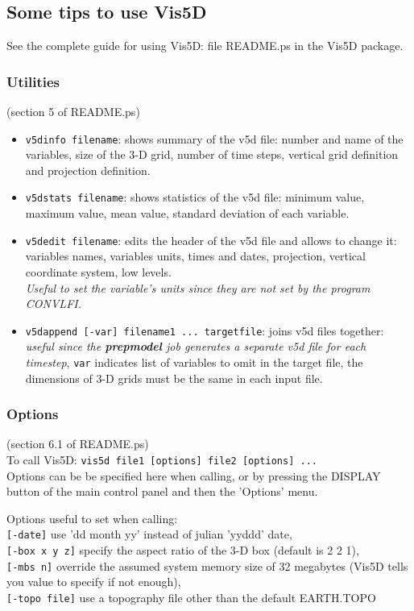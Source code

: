\subsection{Some tips to use Vis5D}
See the complete guide for using Vis5D: file README.ps in the Vis5D package.

\subsubsection{Utilities} (section 5 of README.ps)
\begin{itemize}
\item
{\tt v5dinfo filename}: shows summary of the v5d file: number and name of
the variables, size of the 3-D grid, number of time steps, vertical
grid definition and projection definition.
\item
{\tt v5dstats filename}: shows statistics of the v5d file:
minimum value, maximum value, mean value, standard deviation of
 each variable.
\item
{\tt v5dedit filename}: edits the header of the v5d file and allows to change
it: variables names, variables units, times and dates, projection, vertical
coordinate system, low levels. \\
{\it Useful to set the variable's units since they are not set by the program
 CONVLFI.}
\item
{\tt v5dappend [-var] filename1 ... targetfile}: joins v5d files together: 
{\it useful since the {\bf prepmodel} job generates a separate v5d file for each
 timestep}, {\tt var} indicates list of variables to omit in the target file,
the dimensions of 3-D grids must be the same in each input file.
\end{itemize}

\subsubsection{Options} \label{ss:opt} (section 6.1 of README.ps) \\

To call Vis5D: {\tt vis5d file1 [options] file2 [options] ...} \\
Options can be be specified here when calling, or by pressing the {\sf DISPLAY}
button of the main control panel and then the 'Options' menu.

Options useful to set when calling: \\
{\tt [-date]} use 'dd month yy' instead of julian 'yyddd' date, \\
{\tt [-box x y z]} specify the aspect ratio of the 3-D box (default is 2 2 1), \\
{\tt [-mbs n]} override the assumed system memory size of 32 megabytes (Vis5D
tells you value to specify if not enough), \\
{\tt [-topo file]} use a topography file other than the default EARTH.TOPO



